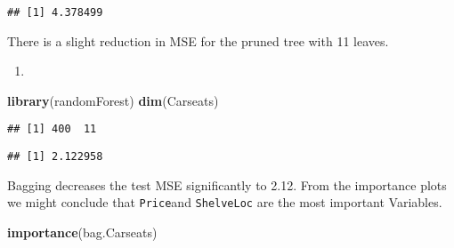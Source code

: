 \documentclass[]{article}
\newenvironment{Shaded}{\begin{snugshade}}{\end{snugshade}}
\newcommand{\DataTypeTok}[1]{\textcolor[rgb]{0.13,0.29,0.53}{#1}}
\newcommand{\DecValTok}[1]{\textcolor[rgb]{0.00,0.00,0.81}{#1}}
\newcommand{\KeywordTok}[1]{\textcolor[rgb]{0.13,0.29,0.53}{\textbf{#1}}}
\newcommand{\NormalTok}[1]{#1}
\newcommand{\OperatorTok}[1]{\textcolor[rgb]{0.81,0.36,0.00}{\textbf{#1}}}
\newcommand{\OtherTok}[1]{\textcolor[rgb]{0.56,0.35,0.01}{#1}}
\newcommand{\StringTok}[1]{\textcolor[rgb]{0.31,0.60,0.02}{#1}}
\begin{document}
\begin{verbatim}
## [1] 4.378499
\end{verbatim}

There is a slight reduction in MSE for the pruned tree with 11 leaves.

\begin{enumerate}
\def\labelenumi{\alph{enumi})}
\setcounter{enumi}{3}
\item
\end{enumerate}

\begin{Shaded}
\begin{Highlighting}[]
\KeywordTok{library}\NormalTok{(randomForest)}
\KeywordTok{dim}\NormalTok{(Carseats)}
\end{Highlighting}
\end{Shaded}

\begin{verbatim}
## [1] 400  11
\end{verbatim}

\begin{Shaded}
\end{Shaded}

\begin{verbatim}
## [1] 2.122958
\end{verbatim}

Bagging decreases the test MSE significantly to 2.12. From the
importance plots we might conclude that \texttt{Price}and
\texttt{ShelveLoc} are the most important Variables.

\begin{Shaded}
\begin{Highlighting}[]
\KeywordTok{importance}\NormalTok{(bag.Carseats)}
\end{Highlighting}
\end{Shaded}
\end{document}
